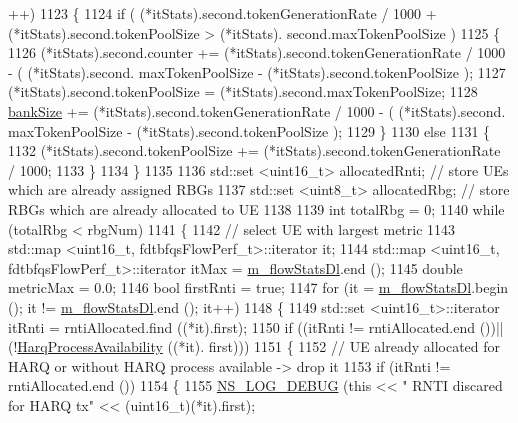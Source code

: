 \begin{DoxyCode}
      ++)
1123     \{
1124       \textcolor{keywordflow}{if} ( (*itStats).second.tokenGenerationRate / 1000 +  (*itStats).second.tokenPoolSize > (*itStats).
      second.maxTokenPoolSize )     
1125         \{
1126           (*itStats).second.counter +=  (*itStats).second.tokenGenerationRate / 1000 - ( (*itStats).second.
      maxTokenPoolSize -  (*itStats).second.tokenPoolSize );
1127           (*itStats).second.tokenPoolSize = (*itStats).second.maxTokenPoolSize;
1128           \hyperlink{classns3_1_1FdTbfqFfMacScheduler_a2e499981c641859beb7ae48a0c343ba1}{bankSize} += (*itStats).second.tokenGenerationRate / 1000 - ( (*itStats).second.
      maxTokenPoolSize -  (*itStats).second.tokenPoolSize );
1129         \}
1130       \textcolor{keywordflow}{else}
1131         \{
1132           (*itStats).second.tokenPoolSize += (*itStats).second.tokenGenerationRate / 1000;
1133         \}
1134     \}
1135 
1136   std::set <uint16\_t> allocatedRnti;   \textcolor{comment}{// store UEs which are already assigned RBGs}
1137   std::set <uint8\_t> allocatedRbg;  \textcolor{comment}{// store RBGs which are already allocated to UE}
1138 
1139   \textcolor{keywordtype}{int} totalRbg = 0;
1140   \textcolor{keywordflow}{while} (totalRbg < rbgNum)
1141     \{
1142       \textcolor{comment}{// select UE with largest metric}
1143       std::map <uint16\_t, fdtbfqsFlowPerf\_t>::iterator it;
1144       std::map <uint16\_t, fdtbfqsFlowPerf\_t>::iterator itMax = \hyperlink{classns3_1_1FdTbfqFfMacScheduler_ad55ff3305031aa6d2b3d351145754972}{m\_flowStatsDl}.end ();
1145       \textcolor{keywordtype}{double} metricMax = 0.0;
1146       \textcolor{keywordtype}{bool} firstRnti = \textcolor{keyword}{true};
1147       \textcolor{keywordflow}{for} (it = \hyperlink{classns3_1_1FdTbfqFfMacScheduler_ad55ff3305031aa6d2b3d351145754972}{m\_flowStatsDl}.begin (); it != \hyperlink{classns3_1_1FdTbfqFfMacScheduler_ad55ff3305031aa6d2b3d351145754972}{m\_flowStatsDl}.end (); it++)
1148         \{
1149           std::set <uint16\_t>::iterator itRnti = rntiAllocated.find ((*it).first);
1150           \textcolor{keywordflow}{if} ((itRnti != rntiAllocated.end ())||(!\hyperlink{classns3_1_1FdTbfqFfMacScheduler_ad6dba4921f9a502a6c02d1f9095f0a17}{HarqProcessAvailability} ((*it).
      first)))
1151             \{
1152               \textcolor{comment}{// UE already allocated for HARQ or without HARQ process available -> drop it}
1153               \textcolor{keywordflow}{if} (itRnti != rntiAllocated.end ())
1154                 \{
1155                   \hyperlink{group__logging_ga413f1886406d49f59a6a0a89b77b4d0a}{NS\_LOG\_DEBUG} (\textcolor{keyword}{this} << \textcolor{stringliteral}{" RNTI discared for HARQ tx"} << (uint16\_t)(*it).first);

\end{DoxyCode}
